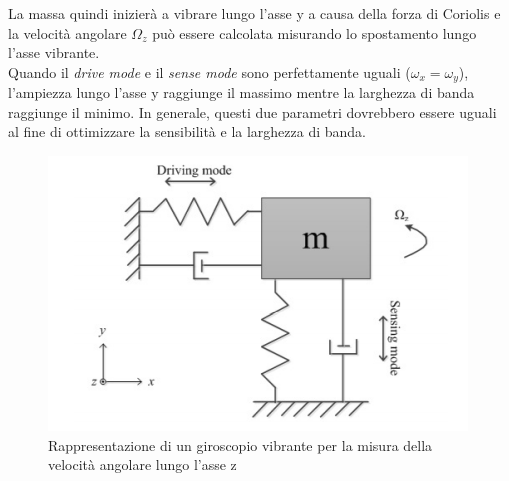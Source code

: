 La massa quindi inizierà a vibrare lungo l'asse y a causa della forza di Coriolis e la velocità angolare $\Omega_z$ può essere calcolata misurando lo spostamento lungo l'asse vibrante. \\
Quando il \textit{drive mode} e il \textit{sense mode} sono perfettamente uguali ($\omega_x = \omega_y$), l'ampiezza lungo l'asse y raggiunge il massimo mentre la larghezza di banda raggiunge il minimo. In generale, questi due parametri dovrebbero essere uguali al fine di ottimizzare la sensibilità e la larghezza di banda.
 \begin{figure}[H]  
	\centering 
	\includegraphics[scale=1]{tecnologie/gyro.png}
	\caption{Rappresentazione di un giroscopio vibrante per la misura della velocità angolare lungo l'asse z}
	\label{fig:gyro}
\end{figure}




